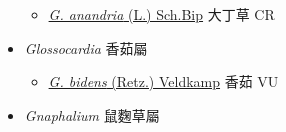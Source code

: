 \begin{itemize}
  \begin{itemize}
        \item[] \href{http://www.theplantlist.org/tpl1.1/search?q=Gerbera+anandria}{\textit{G. anandria} (L.) Sch.Bip}   大丁草   CR
  \end{itemize}
 \item[] \textit{Glossocardia} 香茹屬
                                
  \begin{itemize}
        \item[] \href{http://www.theplantlist.org/tpl1.1/search?q=Glossocardia+bidens}{\textit{G. bidens} (Retz.) Veldkamp}   香茹   VU
  \end{itemize}
 \item[] \textit{Gnaphalium} 鼠麴草屬
                                

\end{itemize}
